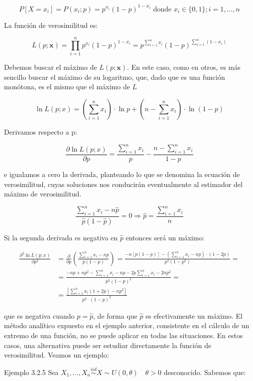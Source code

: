 \documentclass[
]{article}
\begin{document}
\[
P\left[X=x_{i}\right]=P\left(x_{i} ; p\right)=p^{x_{i}}(1-p)^{1-x_{i}} \text { donde } x_{i} \in\{0,1\} ; i=1, \ldots, n
\]

La función de verosimilitud es:

\[
L(p ; \mathbf{x})=\prod_{i=1}^{n} p^{x_{i}}(1-p)^{1-x_{i}}=p^{\sum_{i=1}^{n} x_{i}}(1-p)^{\sum_{i=1}^{n}\left(1-x_{i}\right)}
\]

Debemos buscar el máximo de \(L(p ; \mathbf{x})\). En este caso, como en otros, es más sencillo buscar el máximo de su logaritmo, que, dado que es una función monótona, es el mismo que el máximo de \(L\)

\[
\ln L(p ; x)=\left(\sum_{i=1}^{n} x_{i}\right) \cdot \ln p+\left(n-\sum_{i=1}^{n} x_{i}\right) \cdot \ln (1-p)
\]

Derivamos respecto a p:

\[
\frac{\partial \ln L(p ; x)}{\partial p}=\frac{\sum_{i=1}^{n} x_{i}}{p}-\frac{n-\sum_{i=1}^{n} x_{i}}{1-p}
\]

e igualamos a cero la derivada, planteando lo que se denomina la ecuación de verosimilitud, cuyas soluciones nos conducirán eventualmente al estimador del máximo de verosimilitud.

\[
\frac{\sum_{i=1}^{n} x_{i}-n \hat{p}}{\hat{p}(1-\hat{p})}=0 \Rightarrow \hat{p}=\frac{\sum_{i=1}^{n} x_{i}}{n}
\]

Si la segunda derivada es negativa en \(\widehat{p}\) entonces será un máximo:

\[
\begin{aligned}
\frac{\partial^{2} \ln L(p ; x)}{\partial p^{2}} & =\frac{\partial}{\partial p}\left(\frac{\sum_{i=1}^{n} x_{i}-n p}{p(1-p)}\right)=\frac{-n[p(1-p)]-\left(\sum_{i=1}^{n} x_{i}-n p\right) \cdot(1-2 p)}{p^{2}\left(1-p^{2}\right)}= \\
& =\frac{-n p+n p^{2}-\sum_{i=1}^{n} x_{i}-n p-2 p \sum_{i=1}^{n} x_{i}-2 n p^{2}}{p^{2}(1-p)^{2}}= \\
& =\frac{\left[\sum_{i=1}^{n} x_{i}(1+2 p)-n p^{2}\right]}{p^{2} \cdot(1-p)^{2}}
\end{aligned}
\]

que es negativa cuando \(p=\hat{p}\), de forma que \(\hat{p}\) es efectivamente un máximo.
El método analítico expuesto en el ejemplo anterior, consistente en el cálculo de un extremo de una función, no se puede aplicar en todas las situaciones. En estos casos, una alternativa puede ser estudiar directamente la función de verosimilitud. Veamos un ejemplo:

Ejemplo 3.2.5 Sea \(X_{1}, \ldots, X_{n} \stackrel{i i d}{\sim} X \sim U(0, \theta) \quad \theta>0\) desconocido. Sabemos que:
\end{document}
